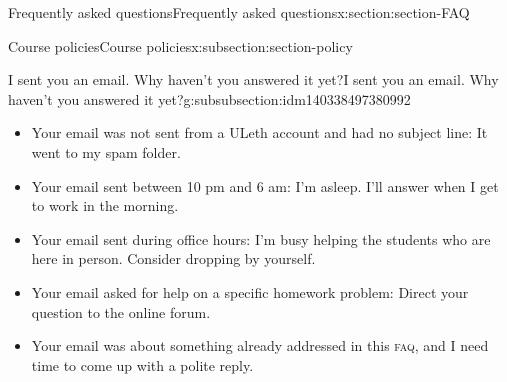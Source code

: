\documentclass[oneside,10pt,]{article}
\newcommand{\initialism}[1]{\textsc{\MakeLowercase{#1}}}
\begin{document}
\begin{sectionptx}{Frequently asked questions}{}{Frequently asked questions}{}{}{x:section:section-FAQ}
\begin{subsectionptx}{Course policies}{}{Course policies}{}{}{x:subsection:section-policy}
\begin{subsubsectionptx}{I sent you an email. Why haven't you answered it yet?}{}{I sent you an email. Why haven't you answered it yet?}{}{}{g:subsubsection:idm140338497380992}
\begin{itemize}[label=\textbullet]
\item{}Your email was not sent from a ULeth account and had no subject line: It went to my spam folder.%
\item{}Your email sent between 10 pm and 6 am: I'm asleep. I'll answer when I get to work in the morning.%
\item{}Your email sent during office hours: I'm busy helping the students who are here in person. Consider dropping by yourself.%
\item{}Your email asked for help on a specific homework problem: Direct your question to the online forum.%
\item{}Your email was about something already addressed in this \initialism{FAQ}, and I need time to come up with a polite reply.%
\end{itemize}
%
\end{subsubsectionptx}
\end{subsectionptx}
\end{sectionptx}
%
%
\pagebreak
\typeout{************************************************}
\typeout{************************************************}
%
\end{document}
